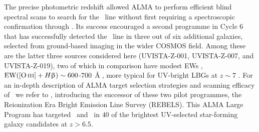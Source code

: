 The precise photometric redshift allowed ALMA to perform efficient blind spectral scans to search for the \CII\ line without first requiring a spectroscopic confirmation through \lya. Its success encouraged a second programme in Cycle 6 \citep[2018.1.00085.S;][]{2022arXiv220204080S} that has successfully detected the \CII\ line in three out of six additional galaxies, selected from ground-based imaging in the wider COSMOS field. Among these are the latter three sources considered here (UVISTA-Z-001, UVISTA-Z-007, and UVISTA-Z-019), two of which in comparison have modest EWs \citep[presented in][]{2022arXiv220204080S}, $\text{EW} ( \OIIIf + \Hbeta ) \sim 600$-$700 \, \Angstrom$, more typical for UV-bright LBGs at $z\sim7$ \citep[e.g.][]{2021MNRAS.500.5229E}. For an in-depth description of ALMA target selection strategies and scanning efficacy of \CII\ we refer to \citet{2022ApJ...931..160B}, introducing the successor of these two pilot programmes, the Reionization Era Bright Emission Line Survey (REBELS). This ALMA Large Program has targeted \CII\ and \OIIIf\ in $40$ of the brightest UV-selected star-forming galaxy candidates at $z > 6.5$.

